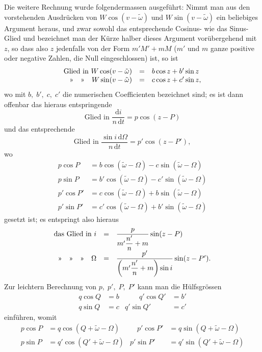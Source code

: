 \par\noindent\hspace*{\parindent}Die weitere Rechnung wurde folgendermassen ausgeführt: Nimmt man aus den vorstehenden Ausdrücken von \(W\cos(v-\tilde\omega)\) und \(W\sin(v-\tilde\omega)\) ein beliebiges Argument heraus, und zwar sowohl das entsprechende Cosinus- wie das Sinus-Glied und bezeichnet man der Kürze halber dieses Argument vorübergehend mit \(z\), so dass also \(z\) jedenfalls von der Form \(m'M'+mM\) (\(m'\) und \(m\) ganze positive oder negative Zahlen, die Null eingeschlossen) ist, so ist
\[
\begin{array}{rcl}
\text{Glied in }W\cos(v-\tilde\omega)&=&b\cos z+b'\sin z\\
\text{»\quad »\quad }W\sin(v-\tilde\omega)&=&c\cos z+c'\sin z,
\end{array}
\]
\noindent wo mit \(b,\;b',\;c,\;c'\) die numerischen Coefficienten bezeichnet sind; es ist dann offenbar das hieraus entspringende
\[
\text{Glied in }\frac{\mathrm{d}i}{n\,\mathrm{d}t}=p\cos(z-P)
\]
\noindent und das entsprechende
\[
\text{Glied in }\frac{\sin i\,\mathrm{d}\Omega}{n\,\mathrm{d}t}=p'\cos(z-P'),
\]
\noindent wo
\[
\begin{aligned}
p\cos P&=b\cos(\tilde\omega-\Omega)-c\sin(\tilde\omega-\Omega)\\
p\sin P&=b'\cos(\tilde\omega-\Omega)-c'\sin(\tilde\omega-\Omega)\\
p'\cos P'&=c\cos(\tilde\omega-\Omega)+b\sin(\tilde\omega-\Omega)\\
p'\sin P'&=c'\cos(\tilde\omega-\Omega)+b'\sin(\tilde\omega-\Omega)
\end{aligned}
\]
\noindent gesetzt ist; es entspringt also hieraus
\[
\begin{array}{rcl}
\text{das Glied in }i&=&\dfrac{p}{m'\dfrac{n'}{n}+m}\sin(z-P)\\[8pt]
\text{»\quad »\quad »\quad }\Omega&=&\dfrac{p'}{\left(m'\dfrac{n'}{n}+m\right)\sin i}\sin(z-P').
\end{array}
\]
\noindent Zur leichtern Berechnung von \(p,\;p',\;P,\;P'\) kann man die Hülfsgrössen
\[
\begin{aligned}
q\cos Q&=b&\qquad q'\cos Q'&=b'\\
q\sin Q&=c& q'\sin Q'&=c'
\end{aligned}
\]
\noindent einführen, womit
\[
\begin{aligned}
p\cos P&=q\cos(Q+\tilde\omega-\Omega)&\quad p'\cos P'&=q\sin(Q+\tilde\omega-\Omega)\\
p\sin P&=q'\cos(Q'+\tilde\omega-\Omega)&p'\sin P'&=q'\sin(Q'+\tilde\omega-\Omega)
\end{aligned}
\]
